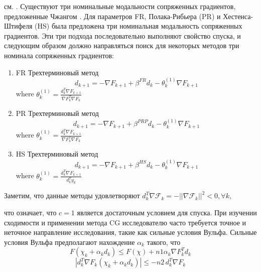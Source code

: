 см. \cite{art8,art9,art10,art11,art12,art13,art14,art15}. Существуют три
номинальные модальности сопряженных градиентов, предложенные Чжангом \cite{art16}. Для
параметров FR, Полака-Рибьера (PR) и Хестенса-Штифеля (HS) была предложена три
номинальная модальность сопряженных градиентов. Эти три подхода последовательно
выполняют свойство спуска, и следующим образом должно направляться поиск для
некоторых методов три номинала сопряженных градиентов:

\begin{enumerate}
    \item FR Трехтерминовый метод
    \begin{equation*}
        d_{k+1}=-\nabla F_{k+1}+\beta^{F R}d_{k}-\theta_{k}^{(1)}\nabla F_{k+1}
    \end{equation*}
    where $ \theta_{k}^{(1)}=\frac{d_{k}^{T}\nabla F_{k+1}}{\nabla F_{k}^{T}\nabla F_{k}} $
    \item PR Трехтерминовый метод
    \begin{equation*}
        d_{k+1}=-\nabla F_{k+1}+\beta^{P R P}d_{k}-\theta_{k}^{(1)}\nabla F_{k+1}
    \end{equation*}
    where $\theta_{k}^{(1)}=\frac{d_{k}^{T}\nabla F_{k+1}}{\nabla F_{k}^{T}\nabla F_{k}}$
    \item HS Трехтерминовый метод
    \begin{equation*}
        d_{k+1}=-\nabla F_{k+1}+\beta^{H S}d_{k}-\theta_{k}^{(1)}\nabla F_{k+1}
    \end{equation*}
    where $ \theta_{k}^{(1)}=\frac{d_{k}^{T}\nabla F_{k+1}}{d_{k}^{T}y_{k}} $
\end{enumerate}

Заметим, что данные методы удовлетворяют $ d_{k}^{T}\mathcal{\nabla F}_{k}=-||\mathcal{\nabla F}_{k}||^{2}<0,\forall k, $

что означает, что $ c = 1 $ является достаточным условием для спуска. При изучении
сходимости и применении метода CG исследователю часто требуется точное и
неточное направление исследования, такие как сильные условия Вульфа. Сильные
условия Вульфа предполагают нахождение $ \alpha_{k} $ такого, что
\begin{equation}\label{eqn:eq5}
    F(\chi_{k}+\alpha_{k}d_{k})\leq F(\chi) + n1 \alpha_{k} \nabla F_{k}^{T}d_{k}
\end{equation}
\begin{equation}\label{eqn:eq6}
    |d_{k}^{T}\nabla F_{k}(\chi_{k}+\alpha_{k}d_{k})|\leq-n2\,d_{k}^{T}\nabla F_{k}
\end{equation}

